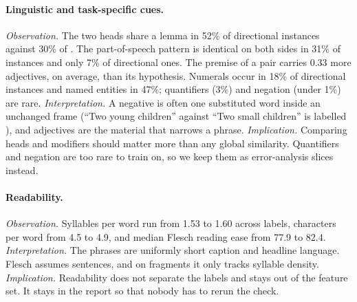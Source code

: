 \paragraph{Linguistic and task-specific cues.}
\textit{Observation.} The two heads share a lemma in 52\% of directional instances against 30\% of \EQ{}. The part-of-speech pattern is identical on both sides in 31\% of \NO{} instances and only 7\% of directional ones. The premise of a \FW{} pair carries 0.33 more adjectives, on average, than its hypothesis. Numerals occur in 18\% of directional instances and named entities in 47\%; quantifiers (3\%) and negation (under 1\%) are rare. \textit{Interpretation.} A negative is often one substituted word inside an unchanged frame (``Two young children'' against ``Two small children'' is labelled \NO{}), and adjectives are the material that narrows a phrase. \textit{Implication.} Comparing heads and modifiers should matter more than any global similarity. Quantifiers and negation are too rare to train on, so we keep them as error-analysis slices instead.

\paragraph{Readability.}
\textit{Observation.} Syllables per word run from 1.53 to 1.60 across labels, characters per word from 4.5 to 4.9, and median Flesch reading ease from 77.9 to 82.4. \textit{Interpretation.} The phrases are uniformly short caption and headline language. Flesch assumes sentences, and on fragments it only tracks syllable density. \textit{Implication.} Readability does not separate the labels and stays out of the feature set. It stays in the report so that nobody has to rerun the check.
